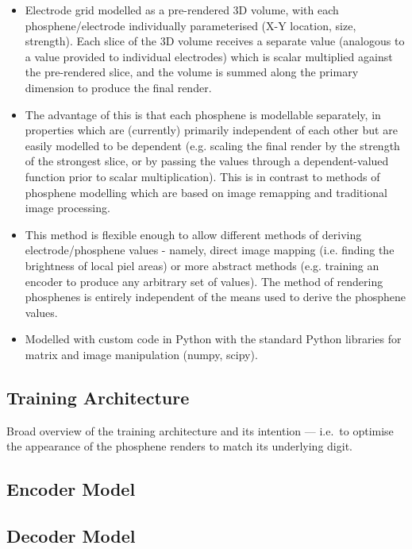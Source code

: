 \documentclass[12pt]{book}
\begin{document}
\begin{itemize}
  \item Electrode grid modelled as a pre-rendered 3D volume, with each phosphene/electrode individually parameterised (X-Y location, size, strength). Each slice of the 3D volume receives a separate value (analogous to a value provided to individual electrodes) which is scalar multiplied against the pre-rendered slice, and the volume is summed along the primary dimension to produce the final render.
  \item The advantage of this is that each phosphene is modellable separately, in properties which are (currently) primarily independent of each other but are easily modelled to be dependent (e.g. scaling the final render by the strength of the strongest slice, or by passing the values through a dependent-valued function prior to scalar multiplication). This is in contrast to methods of phosphene modelling which are based on image remapping and traditional image processing.
  \item This method is flexible enough to allow different methods of deriving electrode/phosphene values - namely, direct image mapping (i.e. finding the brightness of local piel areas) or more abstract methods (e.g. training an encoder to produce any arbitrary set of values). The method of rendering phosphenes is entirely independent of the means used to derive the phosphene values.
  \item Modelled with custom code in Python with the standard Python libraries for matrix and image manipulation (numpy, scipy).
\end{itemize}


\subsection{Training Architecture}

Broad overview of the training architecture and its intention --- i.e.\ to optimise the appearance of the phosphene renders to match its underlying digit.


\subsection{Encoder Model}



\subsection{Decoder Model}
\end{document}
